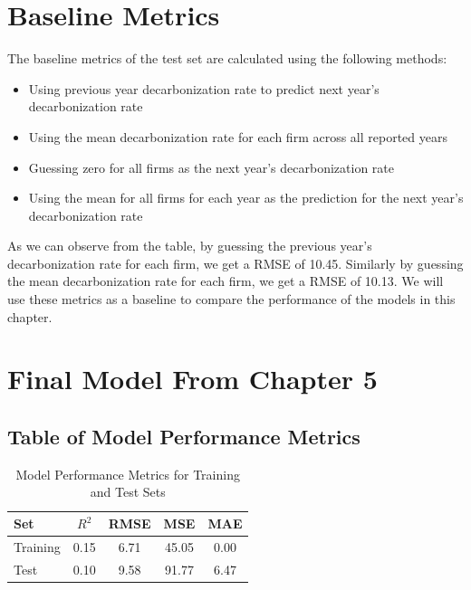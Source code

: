 

\section{Baseline Metrics}
The baseline metrics of the test set are calculated using the following methods:
\begin{itemize}
    \item Using previous year decarbonization rate to predict next year's decarbonization rate
    \item Using the mean decarbonization rate for each firm across all reported years
    \item Guessing zero for all firms as the next year's decarbonization rate
    \item Using the mean for all firms for each year as the prediction for the next year's decarbonization rate
\end{itemize}



As we can observe from the table, by guessing the previous year's decarbonization rate for each firm, we get a RMSE of 10.45. Similarly by guessing the mean decarbonization rate for each firm, we get a RMSE of 10.13. We will use these metrics as a baseline to compare the performance of the models in this chapter.

\section{Final Model From Chapter 5}

\subsection{Table of Model Performance Metrics}
\begin{table}[H]
    \centering
    \caption{Model Performance Metrics for Training and Test Sets}
    \label{tab:model_performance}
    \begin{tabular}{lcccc}
    \hline
    Set & $R^2$ & RMSE & MSE & MAE \\ 
    \hline
    Training & 0.15 & 6.71 & 45.05 & 0.00 \\
    Test & 0.10 & 9.58 & 91.77 & 6.47 \\
    \hline
    \end{tabular}
\end{table}    

